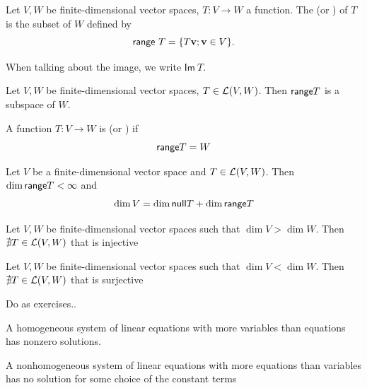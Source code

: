 \documentclass[aspectratio=169]{beamer}
\begin{document}
\begin{frame}
\begin{definition}[Range]
Let $V,W$ be finite-dimensional vector spaces, $T:V\to W$ a function. The  (or ) of $T$ is the subset of $W$ defined by
\[
\mathsf{range}\ T=\{T\mathbf{v};\mathbf{v}\in V\}.
\]
\end{definition}
When talking about the image, we write $\mathsf{Im}\ T$.
\vfill
\begin{importanttheorem}
Let $V,W$ be finite-dimensional vector spaces, $T\in\mathcal{L}(V,W)$. Then $\mathsf{range} T$ is a subspace of $W$.
\end{importanttheorem}

\end{frame}

\begin{frame}
\begin{definition}[Surjectivity]
A function $T:V\to W$ is  (or ) if
\[
\mathsf{range} T=W
\]
\end{definition}
\vfill
\begin{importanttheorem}
Let $V$ be a finite-dimensional vector space and $T\in\mathcal{L}(V,W)$. Then $\dim\mathsf{range} T<\infty$ and
\[
\dim V=\dim\mathsf{null} T+\dim\mathsf{range} T
\]
\end{importanttheorem}
\end{frame}


\begin{frame}
\begin{importanttheorem}
Let $V,W$ be finite-dimensional vector spaces such that $\dim V>\dim W$. Then $\nexists T\in\mathcal{L}(V,W)$ that is injective
\end{importanttheorem}
\vfill
\begin{importanttheorem}
Let $V,W$ be finite-dimensional vector spaces such that $\dim V<\dim W$. Then $\nexists T\in\mathcal{L}(V,W)$ that is surjective
\end{importanttheorem}
\end{frame}



\begin{frame}{Do as exercises..}
\begin{theorem}
A homogeneous system of linear equations with more variables than equations has nonzero solutions.
\end{theorem}
\vfill
\begin{theorem}
A nonhomogeneous system of linear equations with more equations than variables has no solution for some choice of the constant terms
\end{theorem}
\end{frame}
\end{document}
